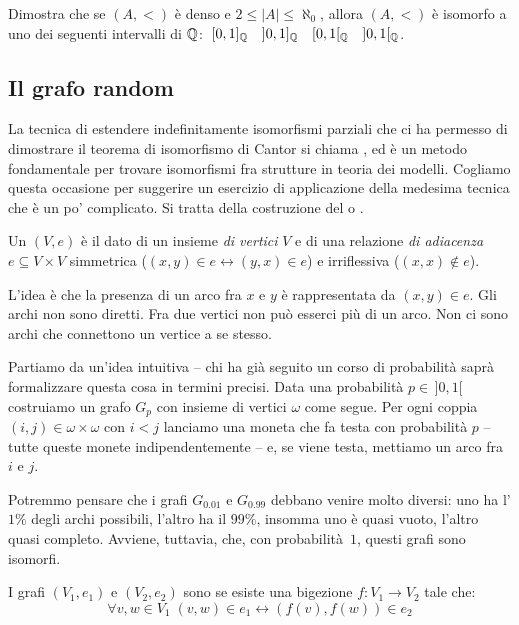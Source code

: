 \begin{exercise}
	Dimostra che se $(A,<)$ \`e denso e $2 \leq |A| \leq \aleph_0$,
allora $(A,<)$ \`e isomorfo a uno dei seguenti intervalli di $\mathbb Q$:
$\;[0,1]_{\mathbb Q} \quad ]0,1]_{\mathbb Q} \quad [0,1[_{\mathbb Q} \quad ]0,1[_{\mathbb Q}$.
\end{exercise}


\subsection{Il grafo random}

La tecnica di estendere indefinitamente isomorfismi parziali che ci ha permesso di dimostrare il teorema di isomorfismo di Cantor
si chiama , ed \`e un metodo fondamentale per
trovare isomorfismi fra strutture in teoria dei modelli.
Cogliamo questa occasione per suggerire un esercizio di applicazione della
medesima tecnica che \`e un po' complicato. Si tratta della costruzione
del  o .

\begin{definition}[Grafo]
	Un  $(V,e)$ \`e il dato di un insieme \textit{di
vertici} $V$ e di una relazione \textit{di adiacenza} $e\subseteq V\times
V$ simmetrica {\drkgrn ($(x,y) \in e \leftrightarrow (y,x) \in e$)} e 
	irriflessiva {\drkgrn ($(x,x) \not\in e$).}

{\drkgrn L'idea \`e che la presenza di un arco fra $x$ e $y$ \`e
rappresentata da $(x,y) \in e$. Gli archi non sono diretti. Fra due
vertici non pu\`o esserci pi\`u di un arco. Non ci sono archi che
connettono un vertice a se stesso.}
\end{definition}

Partiamo da un'idea intuitiva -- chi ha gi\`a seguito un corso di probabilit\`a sapr\`a formalizzare questa cosa in termini precisi. Data una probabilit\`a $p \in \, ]0,1[$ costruiamo un grafo
$G_p$ con insieme di vertici $\omega$ come segue. Per ogni coppia $(i,j) \in \omega \times \omega$ con $i < j$
lanciamo una moneta {\drkred che fa testa con probabilit\`a $p$} -- tutte
queste monete indipendentemente -- e, se viene testa, mettiamo un arco fra $i$ e $j$.

Potremmo pensare che i grafi $G_{0.01}$ e $G_{0.99}$ debbano venire molto
diversi: uno ha l'$1\%$ degli archi possibili, l'altro ha il $99\%$, insomma uno \`e quasi vuoto, l'altro quasi completo. Avviene,
tuttavia, che, con probabilit\`a~$1$, questi grafi sono isomorfi.

\begin{definition}
	I grafi $(V_1,e_1)$ e $(V_2,e_2)$ sono  se esiste
una bigezione $f\colon V_1 \to V_2$ tale che:
	\[ \forall {v,w \in V_1} \; (v,w) \in e_1 \leftrightarrow (f(v),f(w)) \in e_2
		\]
\end{definition}

